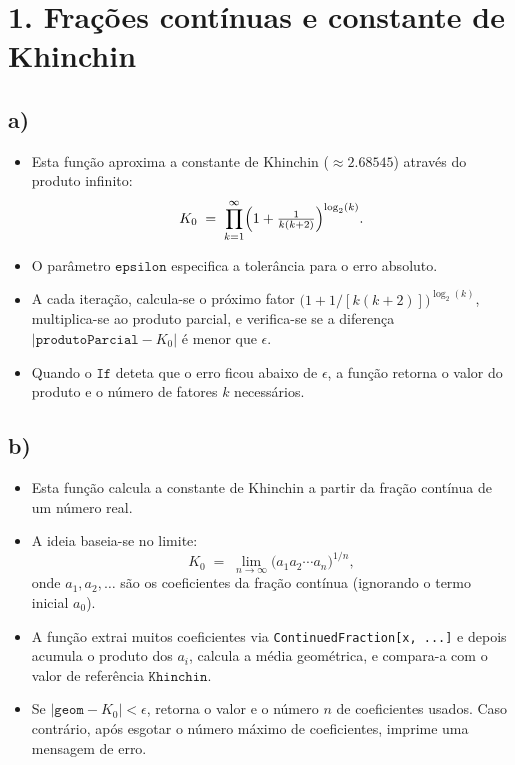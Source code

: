 \documentclass[12pt,a4paper]{article}
\begin{document}
    \setcounter{page}{2}
    \setcounter{secnumdepth}{0} %
    \setlength{\parskip}{0em}

    \newlength{\imagewidth} %
    \setlength{\imagewidth}{8cm} %


    \section{1. Frações contínuas e constante de Khinchin}
    \subsection{a)}
        \begin{itemize}
            \item Esta função aproxima a constante de Khinchin (\(\approx 2.68545\)) através do produto infinito:
            \[
            K_0 \;=\;
            \prod_{k=1}^{\infty}\Bigl(1 + \tfrac{1}{k(k+2)}\Bigr)^{\log_2(k)}.
            \]
            \item O parâmetro \(\texttt{epsilon}\) especifica a tolerância para o erro absoluto.
            \item A cada iteração, calcula-se o próximo fator \(\bigl(1 + 1/[k(k+2)]\bigr)^{\log_2(k)}\), multiplica-se ao produto parcial, e verifica-se se a diferença \(|\texttt{produtoParcial} - K_0|\) é menor que \(\epsilon\).
            \item Quando o \(\texttt{If}\) deteta que o erro ficou abaixo de \(\epsilon\), a função retorna o valor do produto e o número de fatores \(k\) necessários.
        \end{itemize}
    
    \subsection{b)}
        \begin{itemize}
            \item Esta função calcula a constante de Khinchin a partir da fração contínua de um número real.
            \item A ideia baseia-se no limite:
            \[
            K_0 \;=\; \lim_{n \to \infty} \bigl(a_1 a_2 \cdots a_n\bigr)^{1/n},
            \]
            onde \(a_1,a_2,\dots\) são os coeficientes da fração contínua (ignorando o termo inicial \(a_0\)).
            \item A função extrai muitos coeficientes via \texttt{ContinuedFraction[x, ...]} e depois acumula o produto dos \(a_i\), calcula a média geométrica, e compara-a com o valor de referência \(\texttt{Khinchin}\).
            \item Se \(|\texttt{geom} - K_0|<\epsilon\), retorna o valor e o número \(n\) de coeficientes usados. Caso contrário, após esgotar o número máximo de coeficientes, imprime uma mensagem de erro.
        \end{itemize}
\end{document}
